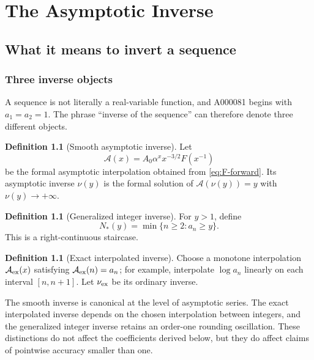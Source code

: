 \documentclass[11pt,a4paper,oneside,openany]{book}
\theoremstyle{definition}
\newtheorem{definition}[theorem]{Definition}
\theoremstyle{remark}
\begin{document}
\part{The Asymptotic Inverse}

\chapter{What it means to invert a sequence}
\label{ch:inverse-meaning}

\section{Three inverse objects}
A sequence is not literally a real-variable function, and A000081 begins with
$a_1=a_2=1$.  The phrase ``inverse of the sequence'' can therefore denote three
different objects.

\begin{definition}[Smooth asymptotic inverse]
Let
\begin{equation}
 \mathcal A(x)=A_0\alpha^x x^{-3/2}F(x^{-1})
 \label{eq:smooth-interpolant}
\end{equation}
be the formal asymptotic interpolation obtained from
\cref{eq:F-forward}.  Its asymptotic inverse $\nu(y)$ is the formal solution of
$\mathcal A(\nu(y))=y$ with $\nu(y)\to+\infty$.
\end{definition}

\begin{definition}[Generalized integer inverse]
For $y>1$, define
\begin{equation}
 N_*(y)=\min\{n\ge2:a_n\ge y\}.
 \label{eq:integer-inverse}
\end{equation}
This is a right-continuous staircase.
\end{definition}

\begin{definition}[Exact interpolated inverse]
Choose a monotone interpolation $\mathcal A_{\rm ex}(x)$ satisfying
$\mathcal A_{\rm ex}(n)=a_n$; for example, interpolate $\log a_n$ linearly on
each interval $[n,n+1]$.  Let $\nu_{\rm ex}$ be its ordinary inverse.
\end{definition}

The smooth inverse is canonical at the level of asymptotic series.  The exact
interpolated inverse depends on the chosen interpolation between integers, and
the generalized integer inverse retains an order-one rounding oscillation.
These distinctions do not affect the coefficients derived below, but they do
affect claims of pointwise accuracy smaller than one.
\end{document}

